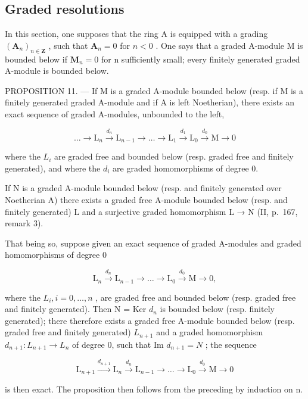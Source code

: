 \subsection{Graded resolutions}

In this section, one supposes that the ring A is equipped with a grading \((\mathbf{A}_n)_{n\in \mathbf{Z}}\) , such that \(\mathbf{A}_n = 0\) for \(n < 0\) . One says that a graded A-module M is bounded below if \(\mathbf{M}_n = 0\) for n sufficiently small; every finitely generated graded A-module is bounded below.

PROPOSITION 11. --- If M is a graded A-module bounded below (resp. if M is a finitely generated graded A-module and if A is left Noetherian), there exists an exact sequence of graded A-modules, unbounded to the left,

\[
\dots \longrightarrow \mathrm{L} _ {n} \xrightarrow {d _ {n}} \mathrm{L} _ {n - 1} \longrightarrow \dots \longrightarrow \mathrm{L} _ {1} \xrightarrow {d _ {1}} \mathrm{L} _ {0} \xrightarrow {d _ {0}} \mathrm{M} \longrightarrow 0
\]

where the \(L_{i}\) are graded free and bounded below (resp. graded free and finitely generated), and where the \(d_{i}\) are graded homomorphisms of degree 0.

If N is a graded A-module bounded below (resp. and finitely generated over Noetherian A) there exists a graded free A-module bounded below (resp. and finitely generated) L and a surjective graded homomorphism L → N (II, p.~167, remark 3).

That being so, suppose given an exact sequence of graded A-modules and graded homomorphisms of degree 0

\[
\mathrm{L} _ {n} \xrightarrow {d _ {n}} \mathrm{L} _ {n - 1} \longrightarrow \dots \longrightarrow \mathrm{L} _ {0} \xrightarrow {d _ {0}} \mathrm{M} \longrightarrow 0,
\]

where the \(L_{i}, i = 0, \ldots, n\) , are graded free and bounded below (resp. graded free and finitely generated). Then N = Ker \(d_{n}\) is bounded below (resp. finitely generated); there therefore exists a graded free A-module bounded below (resp. graded free and finitely generated) \(L_{n+1}\) and a graded homomorphism \(d_{n+1}: L_{n+1} \to L_{n}\) of degree 0, such that Im \(d_{n+1} = N\) ; the sequence

\[
\mathrm{L} _ {n + 1} \xrightarrow {d _ {n + 1}} \mathrm{L} _ {n} \xrightarrow {d _ {n}} \mathrm{L} _ {n - 1} \longrightarrow \dots \longrightarrow \mathrm{L} _ {0} \xrightarrow {d _ {0}} \mathrm{M} \longrightarrow 0
\]

is then exact. The proposition then follows from the preceding by induction on n.

